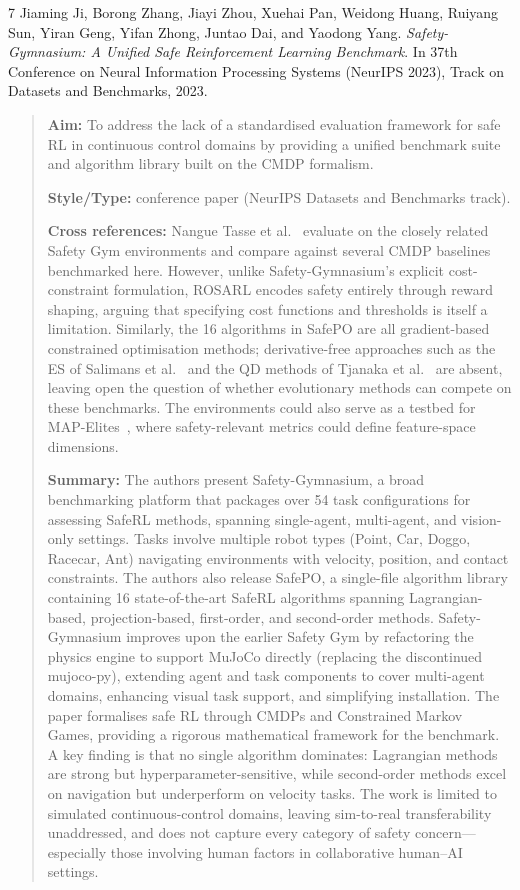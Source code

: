 \documentclass[12pt, a4paper]{article}
\begin{document}
\begin{thebibliography}{7}
Jiaming Ji, Borong Zhang, Jiayi Zhou, Xuehai Pan, Weidong Huang, Ruiyang Sun, Yiran Geng, Yifan Zhong, Juntao Dai, and Yaodong Yang.
\textit{Safety-Gymnasium: A Unified Safe Reinforcement Learning Benchmark}.
In 37th Conference on Neural Information Processing Systems (NeurIPS 2023), Track on Datasets and Benchmarks, 2023.

\begin{quotation}
\noindent
\textbf{Aim:} To address the lack of a standardised evaluation framework for safe RL in continuous control domains by providing a unified benchmark suite and algorithm library built on the CMDP formalism.

\textbf{Style/Type:} conference paper (NeurIPS Datasets and Benchmarks track).

\textbf{Cross references:} Nangue Tasse et al.~\cite{nanguetasse2024rosarl} evaluate on the closely related Safety Gym environments and compare against several CMDP baselines benchmarked here. However, unlike Safety-Gymnasium's explicit cost-constraint formulation, ROSARL encodes safety entirely through reward shaping, arguing that specifying cost functions and thresholds is itself a limitation. Similarly, the 16 algorithms in SafePO are all gradient-based constrained optimisation methods; derivative-free approaches such as the ES of Salimans et al.~\cite{salimans2017evolution} and the QD methods of Tjanaka et al.~\cite{tjanaka2022approximating} are absent, leaving open the question of whether evolutionary methods can compete on these benchmarks. The environments could also serve as a testbed for MAP-Elites~\cite{mouret2015illuminating}, where safety-relevant metrics could define feature-space dimensions.

\textbf{Summary:} The authors present Safety-Gymnasium, a broad benchmarking platform that packages over 54 task configurations for assessing SafeRL methods, spanning single-agent, multi-agent, and vision-only settings. Tasks involve multiple robot types (Point, Car, Doggo, Racecar, Ant) navigating environments with velocity, position, and contact constraints. The authors also release SafePO, a single-file algorithm library containing 16 state-of-the-art SafeRL algorithms spanning Lagrangian-based, projection-based, first-order, and second-order methods. Safety-Gymnasium improves upon the earlier Safety Gym by refactoring the physics engine to support MuJoCo directly (replacing the discontinued mujoco-py), extending agent and task components to cover multi-agent domains, enhancing visual task support, and simplifying installation. The paper formalises safe RL through CMDPs and Constrained Markov Games, providing a rigorous mathematical framework for the benchmark. A key finding is that no single algorithm dominates: Lagrangian methods are strong but hyperparameter-sensitive, while second-order methods excel on navigation but underperform on velocity tasks. The work is limited to simulated continuous-control domains, leaving sim-to-real transferability unaddressed, and does not capture every category of safety concern---especially those involving human factors in collaborative human--AI settings.
\end{quotation}


\end{thebibliography}
\end{document}

